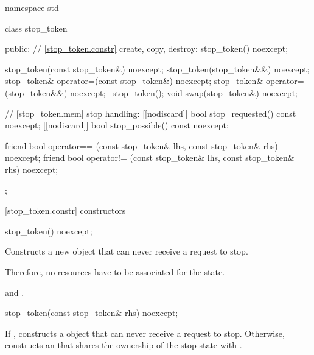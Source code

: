 {\begin{codeblock}
namespace std {
  class stop_token {
  public:
    // \ref{stop_token.constr} create, copy, destroy:
    stop_token() noexcept;

    stop_token(const stop_token&) noexcept;
    stop_token(stop_token&&) noexcept;
    stop_token& operator=(const stop_token&) noexcept;
    stop_token& operator=(stop_token&&) noexcept;
    ~stop_token();
    void swap(stop_token&) noexcept;

    // \ref{stop_token.mem} stop handling:
    [[nodiscard]] bool stop_requested() const noexcept;
    [[nodiscard]] bool stop_possible() const noexcept;

    friend bool operator== (const stop_token& lhs, const stop_token& rhs) noexcept;
    friend bool operator!= (const stop_token& lhs, const stop_token& rhs) noexcept;
  };
}
\end{codeblock}


[stop_token.constr]{ constructors}

%
\begin{itemdecl}
stop_token() noexcept;
\end{itemdecl}
\begin{itemdescr}
  \pnum\effects Constructs a new  object that can never receive a request to stop.
                \begin{note} Therefore, no resources have to be associated for the state. \end{note}

  \pnum\postconditions {} and 
                       .
\end{itemdescr}


%
\begin{itemdecl}
stop_token(const stop_token& rhs) noexcept;
\end{itemdecl}
\begin{itemdescr}
  \pnum\effects If , constructs a  object
                that can never receive a request to stop.
                Otherwise, constructs an 
                that shares the ownership of the stop state with .


\end{itemdescr}}
